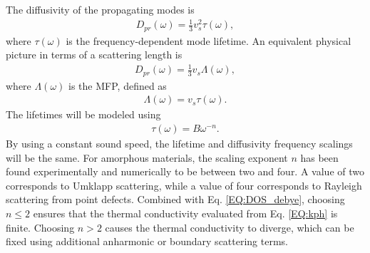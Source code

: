 The diffusivity of the propagating modes is    
\begin{equation}\label{EQ:Dtau}
\begin{split}
D_{pr}(\omega) = \frac{1}{3}v^2_s\tau(\omega),
\end{split}
\end{equation}
where $\tau(\omega)$ is the frequency-dependent mode 
lifetime.\cite{ziman_electrons_2001} An equivalent physical 
picture in terms of a scattering length is
\begin{equation}\label{EQ:DLambda}
\begin{split}
D_{pr}(\omega) = \frac{1}{3}v_s \Lambda(\omega),
\end{split}
\end{equation}
where $\Lambda(\omega)$ is the MFP, defined as 
\begin{equation}\label{EQ:Lambda}
\begin{split}
\Lambda(\omega) = v_{s} \tau(\omega).
\end{split}
\end{equation}
The lifetimes will be modeled using 
\begin{equation}\label{EQ:tauw2}
\begin{split}
\tau(\omega) = B \omega^{-n}.
\end{split}
\end{equation}
By using a constant sound speed, the lifetime and diffusivity 
frequency scalings will be the same. 
For amorphous materials, the scaling exponent $n$ 
has been found experimentally and numerically to be 
between two and four.
\cite{
feldman_thermal_1993,morath_phonon_1996,benassi_evidence_1996,
feldman_numerical_1999,taraskin_determination_1999,
taraskin_propagation_2000,gotze_evolution_2000,ruocco_relaxation_2000,
ruocco_high-frequency_2001,horbach_high_2001,
matic_sound_2001,
feldman_calculations_2002,ruffle_observation_2003,
masciovecchio_evidence_2006,schirmacher_acoustic_2007,
christie_vibrational_2007,
shintani_universal_2008,xu_energy_2009,
liu_high_2009,ganter_rayleigh_2010,
vitelli_heat_2010,
baldi_sound_2010,yang_anomalously_2010,
wyart_scaling_2010,baldi_elastic_2011,
he_heat_2011,ayrinhac_subterahertz_2011,
baldi_emergence_2013}
A value of two corresponds to 
Umklapp scattering,\cite{callaway_model_1959} while a value of four 
corresponds to 
Rayleigh scattering from point defects.\cite{klemens_scattering_1955}
Combined with Eq. \eqref{EQ:DOS_debye}, choosing $n\le2$ ensures 
that the thermal conductivity evaluated from Eq. \eqref{EQ:kph} is finite. 
Choosing $n>2$ causes the thermal conductivity to diverge,   
which can be fixed using additional anharmonic
\cite{feldman_thermal_1993,feldman_numerical_1999} 
or boundary scattering terms.
\cite{cahill_thermal_1994,liu_high_2009,yang_anomalously_2010}

